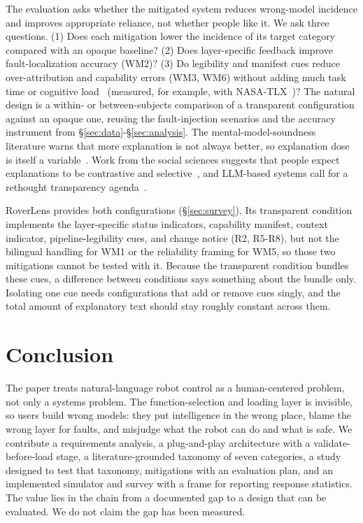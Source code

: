 \documentclass[sigconf]{acmart}
\begin{document}
The evaluation asks whether the mitigated system reduces wrong-model incidence and improves appropriate reliance, not whether people like it. We ask three questions. (1) Does each mitigation lower the incidence of its target category compared with an opaque baseline? (2) Does layer-specific feedback improve fault-localization accuracy (WM2)? (3) Do legibility and manifest cues reduce over-attribution and capability errors (WM3, WM6) without adding much task time or cognitive load~\cite{kulesza2013too} (measured, for example, with NASA-TLX~\cite{hart1988nasa})? The natural design is a within- or between-subjects comparison of a transparent configuration against an opaque one, reusing the fault-injection scenarios and the accuracy instrument from \S\ref{sec:data}-\S\ref{sec:analysis}. The mental-model-soundness literature warns that more explanation is not always better, so explanation dose is itself a variable~\cite{kulesza2012tell, kulesza2013too}. Work from the social sciences suggests that people expect explanations to be contrastive and selective~\cite{miller2019explanation}, and LLM-based systems call for a rethought transparency agenda~\cite{liao2024transparency}.

RoverLens provides both configurations (\S\ref{sec:survey}). Its transparent condition implements the layer-specific status indicators, capability manifest, context indicator, pipeline-legibility cues, and change notice (R2, R5-R8), but not the bilingual handling for WM1 or the reliability framing for WM5, so those two mitigations cannot be tested with it. Because the transparent condition bundles these cues, a difference between conditions says something about the bundle only. Isolating one cue needs configurations that add or remove cues singly, and the total amount of explanatory text should stay roughly constant across them.

\section{Conclusion}

The paper treats natural-language robot control as a human-centered problem, not only a systems problem. The function-selection and loading layer is invisible, so users build wrong models: they put intelligence in the wrong place, blame the wrong layer for faults, and misjudge what the robot can do and what is safe. We contribute a requirements analysis, a plug-and-play architecture with a validate-before-load stage, a literature-grounded taxonomy of seven categories, a study designed to test that taxonomy, mitigations with an evaluation plan, and an implemented simulator and survey with a frame for reporting response statistics. The value lies in the chain from a documented gap to a design that can be evaluated. We do not claim the gap has been measured.
\end{document}
